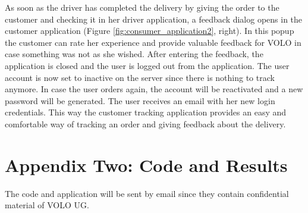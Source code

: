 As soon as the driver has completed the delivery by giving the order to the customer and checking it in her driver application, a feedback dialog opens in the customer application (Figure \ref{fig:consumer_application2}, right). In this popup the customer can rate her experience and provide valuable feedback for VOLO in case something was not as she wished.\newline
After entering the feedback, the application is closed and the user is logged out from the application. The user account is now set to inactive on the server since there is nothing to track anymore. In case the user orders again, the account will be reactivated and a new password will be generated. The user receives an email with her new login credentials.\newline
This way the customer tracking application provides an easy and comfortable way of tracking an order and giving feedback about the delivery.
\newpage
\section*{Appendix Two: Code and Results}\label{section:Appendix Two: Code and Results}

The code and application will be sent by email since they contain confidential material of VOLO UG.
